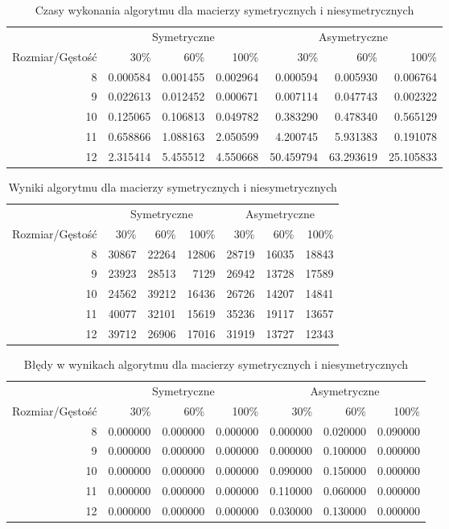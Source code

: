 \begin{table}[ht]
\centering
\begin{tabular}{rrrrrrr}
\toprule
 & \multicolumn{3}{c}{Symetryczne} & \multicolumn{3}{c}{Asymetryczne} \\
Rozmiar/Gęstość & 30\% & 60\% & 100\% & 30\% & 60\% & 100\% \\
\midrule
8 & 0.000584 & 0.001455 & 0.002964 & 0.000594 & 0.005930 & 0.006764 \\
9 & 0.022613 & 0.012452 & 0.000671 & 0.007114 & 0.047743 & 0.002322 \\
10 & 0.125065 & 0.106813 & 0.049782 & 0.383290 & 0.478340 & 0.565129 \\
11 & 0.658866 & 1.088163 & 2.050599 & 4.200745 & 5.931383 & 0.191078 \\
12 & 2.315414 & 5.455512 & 4.550668 & 50.459794 & 63.293619 & 25.105833 \\
\bottomrule
\end{tabular}
\caption{Czasy wykonania algorytmu dla macierzy symetrycznych i niesymetrycznych}
\label{tab:mean_time_brute-forceresoult}
\end{table}
\begin{table}[ht]
\centering
\begin{tabular}{rrrrrrr}
\toprule
 & \multicolumn{3}{c}{Symetryczne} & \multicolumn{3}{c}{Asymetryczne} \\
Rozmiar/Gęstość & 30\% & 60\% & 100\% & 30\% & 60\% & 100\% \\
\midrule
8 & 30867 & 22264 & 12806 & 28719 & 16035 & 18843 \\
9 & 23923 & 28513 & 7129 & 26942 & 13728 & 17589 \\
10 & 24562 & 39212 & 16436 & 26726 & 14207 & 14841 \\
11 & 40077 & 32101 & 15619 & 35236 & 19117 & 13657 \\
12 & 39712 & 26906 & 17016 & 31919 & 13727 & 12343 \\
\bottomrule
\end{tabular}
\caption{Wyniki algorytmu dla macierzy symetrycznych i niesymetrycznych}
\label{tab:resoult_brute-forceresoult}
\end{table}
\begin{table}[ht]
\centering
\begin{tabular}{rrrrrrr}
\toprule
 & \multicolumn{3}{c}{Symetryczne} & \multicolumn{3}{c}{Asymetryczne} \\
Rozmiar/Gęstość & 30\% & 60\% & 100\% & 30\% & 60\% & 100\% \\
\midrule
8 & 0.000000 & 0.000000 & 0.000000 & 0.000000 & 0.020000 & 0.090000 \\
9 & 0.000000 & 0.000000 & 0.000000 & 0.000000 & 0.100000 & 0.000000 \\
10 & 0.000000 & 0.000000 & 0.000000 & 0.090000 & 0.150000 & 0.000000 \\
11 & 0.000000 & 0.000000 & 0.000000 & 0.110000 & 0.060000 & 0.000000 \\
12 & 0.000000 & 0.000000 & 0.000000 & 0.030000 & 0.130000 & 0.000000 \\
\bottomrule
\end{tabular}
\caption{Błędy w wynikach algorytmu dla macierzy symetrycznych i niesymetrycznych}
\label{tab:error_brute-forceresoult}
\end{table}
